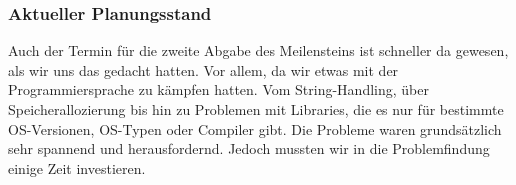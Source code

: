 \subsubsection{Aktueller Planungsstand}
Auch der Termin für die zweite Abgabe des Meilensteins ist schneller da gewesen, als wir uns das gedacht hatten. Vor allem, da wir etwas mit der Programmiersprache zu kämpfen hatten. Vom String-Handling, über Speicherallozierung bis hin zu Problemen mit Libraries, die es nur für bestimmte OS-Versionen, OS-Typen oder Compiler gibt. Die Probleme waren grundsätzlich sehr spannend und herausfordernd. Jedoch mussten wir in die Problemfindung einige Zeit investieren.


